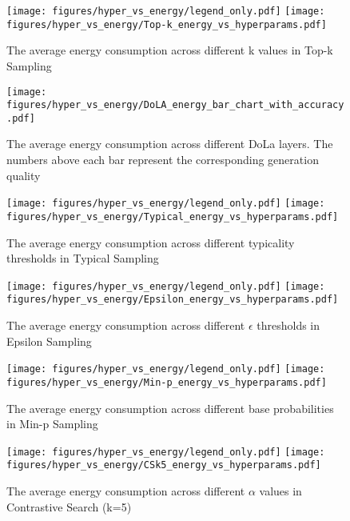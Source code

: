\begin{figure}[h]
    \centering
    \texttt{[image: figures/hyper\_vs\_energy/legend\_only.pdf]}
    \texttt{[image: figures/hyper\_vs\_energy/Top-k\_energy\_vs\_hyperparams.pdf]}
    \caption{The average energy consumption across different k values in Top-k Sampling}
    \label{appendix:fig-topk}
\end{figure}

\begin{figure}[h]
    \centering
    \texttt{[image: figures/hyper\_vs\_energy/DoLA\_energy\_bar\_chart\_with\_accuracy.pdf]}
    \caption{The average energy consumption across different DoLa layers. The numbers above each bar represent the corresponding generation quality}
    \label{appendix:fig-dolaa}
\end{figure}


\begin{figure}[h]
    \centering
    \texttt{[image: figures/hyper\_vs\_energy/legend\_only.pdf]}
    \texttt{[image: figures/hyper\_vs\_energy/Typical\_energy\_vs\_hyperparams.pdf]}
    \caption{The average energy consumption across different typicality thresholds in Typical Sampling}
    \label{appendix:fig-typical}
\end{figure}

\begin{figure}[h]
    \centering
    \texttt{[image: figures/hyper\_vs\_energy/legend\_only.pdf]}
    \texttt{[image: figures/hyper\_vs\_energy/Epsilon\_energy\_vs\_hyperparams.pdf]}
    \caption{The average energy consumption across different \( \epsilon \) thresholds in Epsilon Sampling}
    \label{appendix:fig-epsilon}
\end{figure}

\begin{figure}[h]
    \centering
    \texttt{[image: figures/hyper\_vs\_energy/legend\_only.pdf]}
    \texttt{[image: figures/hyper\_vs\_energy/Min-p\_energy\_vs\_hyperparams.pdf]}
    \caption{The average energy consumption across different base probabilities in Min-p Sampling}
    \label{appendix:fig-minp}
\end{figure}

\begin{figure}[h]
    \centering
    \texttt{[image: figures/hyper\_vs\_energy/legend\_only.pdf]}
    \texttt{[image: figures/hyper\_vs\_energy/CSk5\_energy\_vs\_hyperparams.pdf]}
    \caption{The average energy consumption across different \( \alpha \) values in Contrastive Search (k=5)}
    \label{appendix:fig-CS5}
\end{figure}


